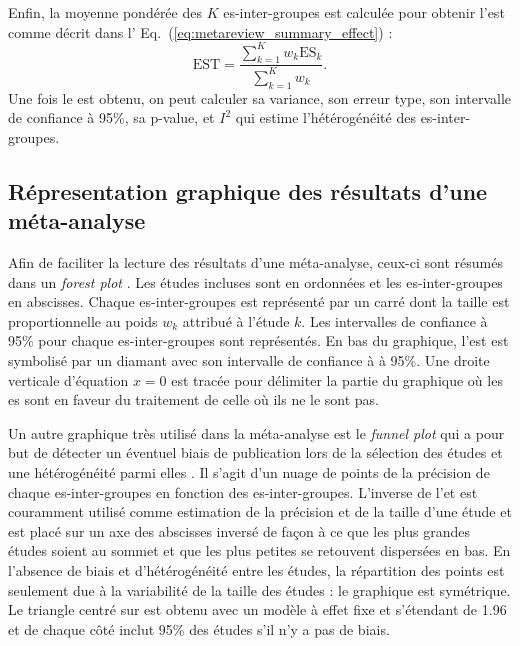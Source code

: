 Enfin, la moyenne pondérée des $K$ \gls{es}-inter-groupes est calculée pour obtenir l'\gls{est} comme décrit dans l' 
Eq.~(\ref{eq:metareview_summary_effect}) \citep{Borenstein2009}:
\begin{equation}
\label{eq:metareview_summary_effect}
\text{EST} = \frac{\sum_{k=1}^{K} w_k \text{ES}_k} {\sum_{k=1}^{K} w_k}.
\end{equation} 
Une fois le \gls{est} obtenu, on peut calculer sa variance, son erreur type, son intervalle de confiance à 95\%, sa p-value, 
et $I^2$ qui estime l'hétérogénéité des \gls{es}-inter-groupes. 

\subsection{Répresentation graphique des résultats d'une méta-analyse}

Afin de faciliter la lecture des résultats d'une méta-analyse, ceux-ci sont résumés dans un \textit{forest plot} \citep{Borenstein2009}. Les études incluses sont
en ordonnées et les \gls{es}-inter-groupes en abscisses. Chaque \gls{es}-inter-groupes est représenté par un carré dont la taille est proportionnelle
au poids $w_k$ attribué à l'étude $k$. Les intervalles de confiance à 95\% pour chaque \gls{es}-inter-groupes sont représentés. En bas du graphique, l'\gls{est}
est symbolisé par un diamant avec son intervalle de confiance à à 95\%. Une droite verticale d'équation $x = 0$ est tracée pour délimiter la
partie du graphique où les \gls{es} sont en faveur du traitement de celle où ils ne le sont pas.

Un autre graphique très utilisé dans la méta-analyse est le \textit{funnel plot} qui a pour but de détecter un éventuel biais de publication
lors de la sélection des études et une hétérogénéité parmi elles \citep{Sterne2011}. Il s'agit d'un nuage de points de la précision de chaque 
\gls{es}-inter-groupes en fonction des \gls{es}-inter-groupes. L'inverse de l'\gls{et} est couramment utilisé comme estimation de la précision et de la 
taille d'une étude et est placé sur un axe des abscisses inversé de façon à ce que les plus grandes études soient au sommet et que les plus petites se retouvent 
dispersées en bas. En l'absence de biais et d'hétérogénéité entre les études, la répartition des points est seulement due à la variabilité de la taille des études : 
le graphique est symétrique. Le triangle centré sur \gls{est} obtenu avec un modèle à effet fixe et s'étendant de 1.96 \gls{et} de chaque côté 
inclut 95\% des études s'il n'y a pas de biais.

